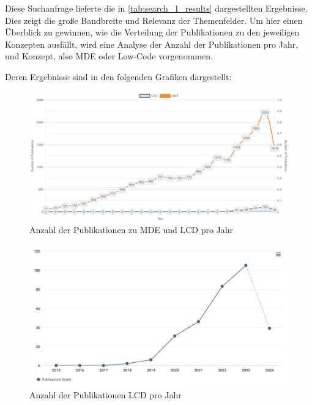 Diese Suchanfrage lieferte die in \ref{tab:search_1_results} dargestellten Ergebnisse. Dies 
zeigt die große Bandbreite und Relevanz der Themenfelder. 
Um hier einen Überblick zu gewinnen, wie die Verteilung der Publikationen zu den jeweiligen Konzepten ausfällt, 
wird eine Analyse der Anzahl der Publikationen pro Jahr, und Konzept, also MDE oder Low-Code vorgenommen.

Deren Ergebnisse sind in den folgenden Grafiken dargestellt:

\begin{figure}[h!]
    \centering
    \includegraphics[width=1\textwidth]{graphics/lcd_and_mde_publications_over_years.png}
    \caption{Anzahl der Publikationen zu MDE und LCD pro Jahr}
    \label{fig:publications_mde_and_lcd_per_year}
\end{figure}

\begin{figure}[h!]
    \centering
    \includegraphics[width=1\textwidth]{graphics/lcd_publications_over_years.png}
    \caption{Anzahl der Publikationen LCD pro Jahr}
    \label{fig:publications_lcd_per_year}
\end{figure}

